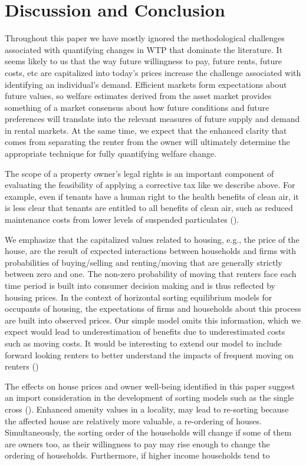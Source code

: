 \documentclass[ecta,nameyear,draft]{econsocart}
\theoremstyle{plain}
\theoremstyle{remark}
\begin{document}
\section{Discussion and Conclusion}
Throughout this paper we have mostly ignored the methodological challenges associated with quantifying changes in WTP that dominate the literature. It seems likely to us that the way future willingness to pay, future rents, future costs, etc are capitalized into today's prices increase the challenge associated with identifying an individual's demand. Efficient markets form expectations about future values, so welfare estimates derived from the asset market provides something of a market consensus about how future conditions and future preferences will translate into the relevant measures of future supply and demand in rental markets. At the same time, we expect that the enhanced clarity that comes from separating the renter from the owner will ultimately determine the appropriate technique for fully quantifying welfare change.

The scope of a property owner's legal rights is an important component of evaluating the feasibility of applying a corrective tax like we describe above. For example, even if tenants have a human right to the health benefits of clean air, it is less clear that tenants are entitled to all benefits of clean air, such as reduced maintenance costs from lower levels of suspended particulates (\cite{bajari12}). 

We emphasize that the capitalized values related to housing, e.g., the price of the house, are the result of expected interactions between households and firms with probabilities of buying/selling and renting/moving that are generally strictly between zero and one. The non-zero probability of moving that renters face each time period is built into consumer decision making and is thus reflected by housing prices. In the context of horizontal sorting equilibrium models for occupants of housing, the expectations of firms and households about this process are built into observed prices. Our simple model omits this information, which we expect would lead to underestimation of benefits due to underestimated costs such as moving costs. It would be interesting to extend our model to include forward looking renters to better understand the impacts of frequent moving on renters (\cite{bishop19}) 

The effects on house prices and owner well-being identified in this paper suggest an import consideration in the development of sorting models such as the single cross (\cite{banzhaf20}). Enhanced amenity values in a locality, may lead to re-sorting because the affected house are relatively more valuable, a re-ordering of houses. Simultaneously, the sorting order of the households will change if some of them are owners too, as their willingness to pay may rise enough to change the ordering of households. Furthermore, if higher income households tend to 
\end{document}
